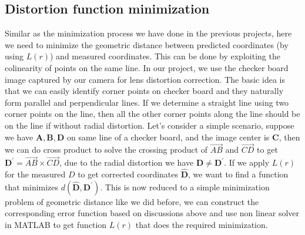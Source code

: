 \documentclass[conference]{IEEEtran}
\let\oldvec\vec
\renewcommand{\vec}[1]{\oldvec{\mathit{#1}}}
\newcommand{\mat}[1]{\mathbf{#1}} %
\begin{document}
\subsection{Distortion function minimization}
Similar as the minimization process we have done in the previous projects, here we need to minimize the geometric distance between predicted coordinates (by using $L(r)$) and measured coordinates. This can be done by exploiting the colinearity of points on the same line. In our project, we use the checker board image captured by our camera for lens distortion correction. The basic idea is that we can easily identify corner points on checker board and they naturally form parallel and perpendicular lines. If we determine a straight line using two corner points on the line, then all the other corner points along the line should be on the line if without radial distortion. Let's consider a simple scenario, suppose we have $\mat{A}, \mat{B}, \mat{D}$ on same line of a checker board, and the image center is $\mat{C}$, then we can do cross product to solve the crossing product of $\vec{AB}$ and $\vec{CD}$ to get $\mat{D}^{\prime} = \vec{AB}\times \vec{CD}$, due to the radial distortion we have $\mat{D} \neq \mat{D}^\prime$. If we apply $L(r)$ for the measured $D$ to get corrected coordinates $\hat{\mat{D}}$, we want to find a function that minimizes $d(\hat{\mat{D}}, \mat{D}^\prime)$. This is now reduced to a simple minimization problem of geometric distance like we did before, we can construct the corresponding error function based on discussions above and use non linear solver in MATLAB to get function $L(r)$ that does the required minimization.

\end{document}
